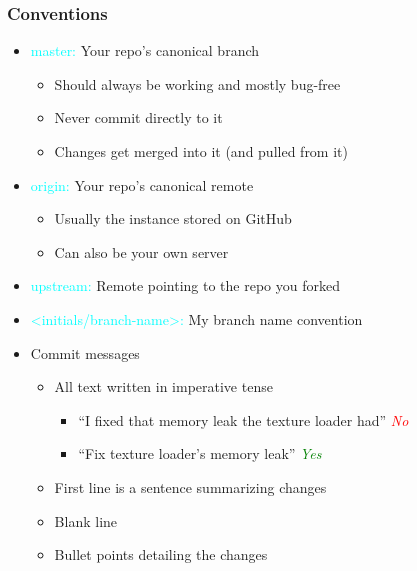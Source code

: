 \documentclass[glossy]{beamer}
\begin{document}
\begin{frame}[fragile=singleslide]
  \frametitle{Conventions}

  \begin{itemize}
    \item \textcolor{cyan}{master:} Your repo's canonical branch
    \begin{itemize}
      \item Should always be working and mostly bug-free
      \item Never commit directly to it
      \item Changes get merged into it (and pulled from it)
    \end{itemize}
    \item \textcolor{cyan}{origin:} Your repo's canonical remote
    \begin{itemize}
      \item Usually the instance stored on GitHub
      \item Can also be your own server
    \end{itemize}
    \item \textcolor{cyan}{upstream:} Remote pointing to the repo you forked
    \item \textcolor{cyan}{<initials/branch-name>:} My branch name convention
    \item Commit messages
    \begin{itemize}
      \item All text written in imperative tense
      \begin{itemize}
        \item \enquote{I fixed that memory leak the texture loader had}  \textcolor{red}{\emph{No}}
        \item \enquote{Fix texture loader's memory leak}  \textcolor{green}{\emph{Yes}}
      \end{itemize}
      \item First line is a sentence summarizing changes
      \item Blank line
      \item Bullet points detailing the changes
    \end{itemize}
  \end{itemize}
\end{frame}
\end{document}
